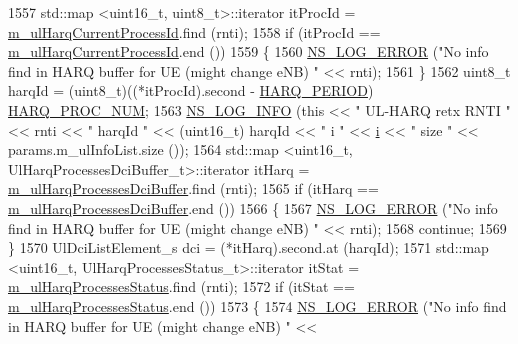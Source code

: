 \begin{DoxyCode}
1557               std::map <uint16\_t, uint8\_t>::iterator itProcId = 
      \hyperlink{classns3_1_1PfFfMacScheduler_aff9dac165a5c80c99f237adf365321d6}{m\_ulHarqCurrentProcessId}.find (rnti);
1558               \textcolor{keywordflow}{if} (itProcId == \hyperlink{classns3_1_1PfFfMacScheduler_aff9dac165a5c80c99f237adf365321d6}{m\_ulHarqCurrentProcessId}.end ())
1559                 \{
1560                   \hyperlink{group__logging_ga0261a8db1d4ac5f79417d117634fd455}{NS\_LOG\_ERROR} (\textcolor{stringliteral}{"No info find in HARQ buffer for UE (might change eNB) "} << 
      rnti);
1561                 \}
1562               uint8\_t harqId = (uint8\_t)((*itProcId).second - \hyperlink{lte-common_8h_a275321ee206f130c3ddc81fcdaa13cfd}{HARQ\_PERIOD}) %
      \hyperlink{cqa-ff-mac-scheduler_8h_a9185d8d7d2b2979181d4a7044a3d3555}{HARQ\_PROC\_NUM};
1563               \hyperlink{group__logging_gafbd73ee2cf9f26b319f49086d8e860fb}{NS\_LOG\_INFO} (\textcolor{keyword}{this} << \textcolor{stringliteral}{" UL-HARQ retx RNTI "} << rnti << \textcolor{stringliteral}{" harqId "} << (uint16\_t)
      harqId << \textcolor{stringliteral}{" i "} << \hyperlink{bernuolliDistribution_8m_a6f6ccfcf58b31cb6412107d9d5281426}{i} << \textcolor{stringliteral}{" size "}  << params.m\_ulInfoList.size ());
1564               std::map <uint16\_t, UlHarqProcessesDciBuffer\_t>::iterator itHarq = 
      \hyperlink{classns3_1_1PfFfMacScheduler_a694ef4299832b3652468b0898601b2de}{m\_ulHarqProcessesDciBuffer}.find (rnti);
1565               \textcolor{keywordflow}{if} (itHarq == \hyperlink{classns3_1_1PfFfMacScheduler_a694ef4299832b3652468b0898601b2de}{m\_ulHarqProcessesDciBuffer}.end ())
1566                 \{
1567                   \hyperlink{group__logging_ga0261a8db1d4ac5f79417d117634fd455}{NS\_LOG\_ERROR} (\textcolor{stringliteral}{"No info find in HARQ buffer for UE (might change eNB) "} << 
      rnti);
1568                   \textcolor{keywordflow}{continue};
1569                 \}
1570               UlDciListElement\_s dci = (*itHarq).second.at (harqId);
1571               std::map <uint16\_t, UlHarqProcessesStatus\_t>::iterator itStat = 
      \hyperlink{classns3_1_1PfFfMacScheduler_a5d5e9dcdbb7d0a291fe397ba7b746d04}{m\_ulHarqProcessesStatus}.find (rnti);
1572               \textcolor{keywordflow}{if} (itStat == \hyperlink{classns3_1_1PfFfMacScheduler_a5d5e9dcdbb7d0a291fe397ba7b746d04}{m\_ulHarqProcessesStatus}.end ())
1573                 \{
1574                   \hyperlink{group__logging_ga0261a8db1d4ac5f79417d117634fd455}{NS\_LOG\_ERROR} (\textcolor{stringliteral}{"No info find in HARQ buffer for UE (might change eNB) "} << 

\end{DoxyCode}
